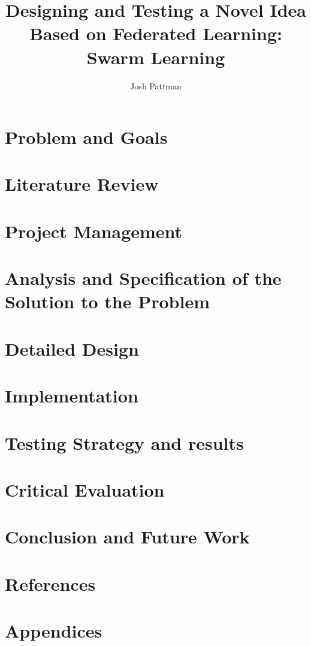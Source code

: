 \documentclass[12pt,a4paper]{report}
\author{Josh Pattman}
\title{Designing and Testing a Novel Idea Based on Federated Learning: Swarm Learning}
\begin{document}
	\maketitle
	\chapter{Problem and Goals}
	\chapter{Literature Review}
	\chapter{Project Management}
	\chapter{Analysis and Specification of the Solution to the Problem}
	\chapter{Detailed Design}
	
	\chapter{Implementation}
	
	
	\chapter{Testing Strategy and results}
	\chapter{Critical Evaluation}
	\chapter{Conclusion and Future Work}
	\chapter{References}
	\chapter{Appendices}
\end{document}
